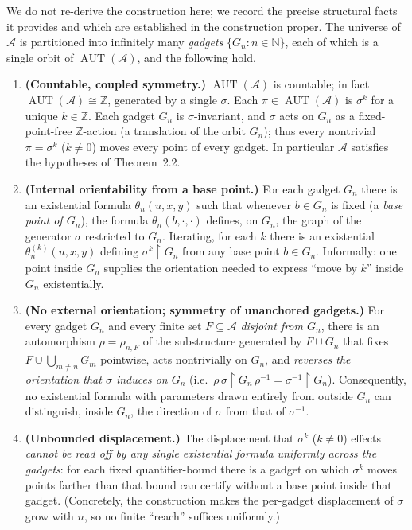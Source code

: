 \documentclass[12pt,fullpage]{article}
\theoremstyle{definition}
\newcommand{\A}{\mathcal{A}}
\newcommand{\N}{\mathbb{N}}
\newcommand{\Z}{{\mathbb{Z}}}
\newcommand{\AUT}{\operatorname{AUT}}
\begin{document}
We do not re-derive the construction here; we record the precise structural
facts it provides and which are established in the construction proper.  The
universe of $\A$ is partitioned into infinitely many \emph{gadgets}
$\{G_n:n\in\N\}$, each of which is a single orbit of $\AUT(\A)$, and the
following hold.

\begin{enumerate}[label=\textbf{(K\arabic*)}]
\item \textbf{(Countable, coupled symmetry.)}\label{K1}
  $\AUT(\A)$ is countable; in fact $\AUT(\A)\cong\Z$, generated by a single
  $\sigma$.  Each $\pi\in\AUT(\A)$ is $\sigma^{k}$ for a unique $k\in\Z$.
  Each gadget $G_n$ is $\sigma$-invariant, and $\sigma$ acts on $G_n$ as a
  fixed-point-free $\Z$-action (a translation of the orbit $G_n$); thus
  every nontrivial $\pi=\sigma^k$ ($k\neq0$) moves every point of every
  gadget.  In particular $\A$ satisfies the hypotheses of Theorem~2.2.

\item \textbf{(Internal orientability from a base point.)}\label{K2}
  For each gadget $G_n$ there is an existential formula
  $\theta_n(u,x,y)$ such that whenever $b\in G_n$ is fixed (a
  \emph{base point of $G_n$}), the formula $\theta_n(b,\cdot,\cdot)$ defines,
  on $G_n$, the graph of the generator $\sigma$ restricted to $G_n$.  Iterating,
  for each $k$ there is an existential $\theta_n^{(k)}(u,x,y)$ defining
  $\sigma^k\restriction G_n$ from any base point $b\in G_n$.  Informally: one
  point inside $G_n$ supplies the orientation needed to express ``move by
  $k$'' inside $G_n$ existentially.

\item \textbf{(No external orientation; symmetry of unanchored gadgets.)}\label{K3}
  For every gadget $G_n$ and every finite set $F\subseteq\A$ \emph{disjoint
  from $G_n$}, there is an automorphism $\rho=\rho_{n,F}$ of the substructure
  generated by $F\cup G_n$ that fixes $F\cup\bigcup_{m\neq n}G_m$ pointwise,
  acts nontrivially on $G_n$, and \emph{reverses the orientation that
  $\sigma$ induces on $G_n$} (i.e.\ $\rho\,\sigma\restriction G_n\,\rho^{-1}
  =\sigma^{-1}\restriction G_n$).  Consequently, no existential formula with
  parameters drawn entirely from outside $G_n$ can distinguish, inside $G_n$,
  the direction of $\sigma$ from that of $\sigma^{-1}$.

\item \textbf{(Unbounded displacement.)}\label{K4}
  The displacement that $\sigma^k$ ($k\neq0$) effects \emph{cannot be read
  off by any single existential formula uniformly across the gadgets}: for
  each fixed quantifier-bound there is a gadget on which $\sigma^k$ moves
  points farther than that bound can certify without a base point inside that
  gadget.  (Concretely, the construction makes the per-gadget displacement of
  $\sigma$ grow with $n$, so no finite ``reach'' suffices uniformly.)
\end{enumerate}
\end{document}
